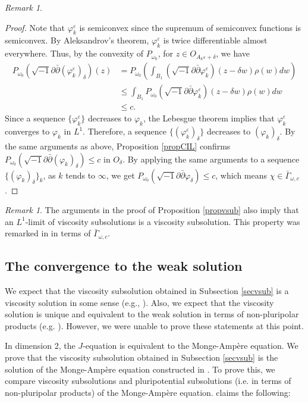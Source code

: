 \documentclass{amsart}
\numberwithin{equation}{section}
\theoremstyle{plain}
\theoremstyle{definition}
\theoremstyle{remark}
\newtheorem{remark}[equation]{Remark}
\newcommand{\delb}{\sqrt{-1}\partial\bar{\partial}}
\begin{document}
\begin{remark}
\begin{proof}
        Note that $\varphi_k^\varepsilon$ is semiconvex since the supremum of semiconvex functions is semiconvex. By Aleksandrov's theorem, $\varphi_k^\varepsilon$ is twice differentiable almost everywhere. 
        Thus, by the convexity of $P_{\omega_0}$, for $z \in O_{A_k\varepsilon+\delta}$, we have 
        \begin{align*}
            P_{\omega_0}(\delb(\varphi_k^\varepsilon)_\delta) (z)
            &= P_{\omega_0}\left(\int_
            {B_1} (\delb\varphi_k^\varepsilon)(z-\delta w)\rho(w)dw\right) \\
            &\le \int_ {B_1} 
            P_{\omega_0}(\delb\varphi_k^\varepsilon)(z-\delta w )\rho(w)dw \\
            &\le c.
        \end{align*}
        Since a sequence $\{\varphi_k^\varepsilon\}$ decreases to $\varphi_k$, the Lebesgue theorem implies that $\varphi_k^\varepsilon$ converges to $\varphi_k$ in $L^1$. Therefore, a sequence $\{(\varphi_k^\varepsilon)_\delta\}$ decreases to $(\varphi_k)_\delta$. By the same arguments as above, Proposition \ref{propCIL} confirms $P_{\omega_0}(\delb(\varphi_k)_\delta) \le c$ in $O_\delta$. By applying the same arguments to a sequence $\{(\varphi_k)_\delta\}_k$, as $k$ tends to $\infty$, we get $P_{\omega_0}(\delb\varphi_\delta)\le c$, which means $\chi\in \bar{\Gamma}_{\omega,c}$.
    \end{proof}
\end{remark}

\begin{remark}\label{remL1}
    The arguments in the proof of Proposition \ref{propvsub} also imply that an $L^1$-limit of viscosity subsolutions is a viscosity subsolution. This property was remarked in \cite[Remark 3.4]{GChen} in terms of $\bar{\Gamma}_{\omega,c}$.
\end{remark}

\subsection{The convergence to the weak solution}\label{secpp}
We expect that the viscosity subsolution obtained in Subsection \ref{secvsub} is a viscosity solution in some sense (e.g., \cite[Definition 3.2]{EGZ3}). Also, we expect that the viscosity solution is unique and equivalent to the weak solution in terms of non-pluripolar products (e.g. \cite{EGZ, EGZ2}). However, we were unable to prove these statements at this point. 

In dimension 2, the $J$-equation is equivalent to the Monge-Amp{\`e}re equation.
We prove that the viscosity subsolution obtained in Subsection \ref{secvsub} is the solution of the Monge-Amp{\`e}re equation constructed in \cite{BEGZ}.  
To prove this, we compare viscosity subsolutions and pluripotential subsolutions (i.e. in terms of non-pluripolar products) of the Monge-Amp{\`e}re equation. 
\cite[Corollary 2.6]{EGZ} claims the following:
\end{document}
